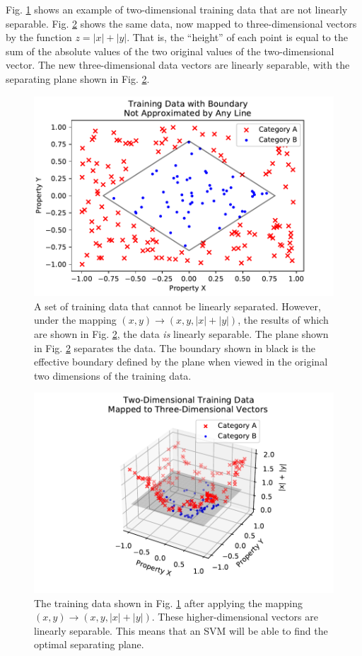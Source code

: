 \documentclass[%
 reprint,
nofootinbib,
 amsmath,amssymb,
 aps,
]{revtex4-2}
\begin{document}
Fig. \ref{fig:kern_2d} shows an example of two-dimensional training data that are not linearly separable. Fig. \ref{fig:kern_3d} shows the same data, now mapped to three-dimensional vectors by the function $z = |x| + |y|$. That is, the ``height'' of each point is equal to the sum of the absolute values of the two original values of the two-dimensional vector. The new three-dimensional data vectors are linearly separable, with the separating plane shown in Fig. \ref{fig:kern_3d}.

\begin{figure}
    \includegraphics[width=\linewidth]{Figures/kern_2d.pdf}
    \caption{\label{fig:kern_2d}A set of training data that cannot be linearly separated. However, under the mapping $(x,y) \rightarrow (x,y, |x|+|y|)$, the results of which are shown in Fig. \ref{fig:kern_3d}, the data \textit{is} linearly separable. The plane shown in Fig. \ref{fig:kern_3d} separates the data. The boundary shown in black is the effective boundary defined by the plane when viewed in the original two dimensions of the training data.}
\end{figure}

\begin{figure}
    \includegraphics[width=\linewidth]{Figures/kern_3d.pdf}
    \caption{\label{fig:kern_3d}The training data shown in Fig. \ref{fig:kern_2d} after applying the mapping $(x,y) \rightarrow (x,y,|x|+|y|)$. These higher-dimensional vectors are linearly separable. This means that an SVM will be able to find the optimal separating plane.}
\end{figure}
\end{document}
